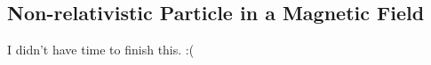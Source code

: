 \documentclass{article}
\begin{document}
\begin{multicols*}{2}
	\subsection{Non-relativistic Particle in a Magnetic Field}
	I didn't have time to finish this. :(

\end{multicols*}
\end{document}
